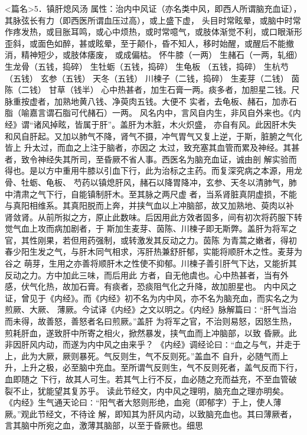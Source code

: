 \documentclass[a4paper,12pt,UTF8,twoside]{ctexbook}
\begin{document}
<篇名>5．镇肝熄风汤
属性：治内中风证（亦名类中风，即西人所谓脑充血证），其脉弦长有力（即西医所谓血压过高），或上盛下虚， 
头目时常眩晕，或脑中时常作疼发热，或目胀耳鸣，或心中烦热，或时常噫气，或肢体渐觉不利，或口眼渐形 
歪斜，或面色如醉，甚或眩晕，至于颠仆，昏不知人，移时始醒，或醒后不能撤消，精神短少，或肢体痿废， 
或成偏枯。 
怀牛膝（一两） 生赭石（一两，轧细） 生龙骨（五钱，捣碎） 生牡蛎（五钱，捣碎） 生龟板 
（五钱，捣碎） 生杭芍（五钱） 玄参（五钱） 天冬（五钱） 川楝子（二钱，捣碎） 生麦芽（二钱） 
茵陈（二钱） 甘草（钱半） 
心中热甚者，加生石膏一两。痰多者，加胆星二钱。尺脉重按虚者，加熟地黄八钱、净萸肉五钱。大便不 
实者，去龟板、赭石，加赤石脂（喻嘉言谓石脂可代赭石）一两。 
风名内中，言风自内生，非风自外来也。《内经》谓“诸风掉眩，皆属于肝”。盖肝为木脏，木火炽盛， 
亦自有风。此因肝木失和风自肝起。又加以肺气不降，肾气不摄，冲气胃气又复上逆，于斯，脏腑之气化皆上 
升太过，而血之上注于脑者，亦因之 
太过，致充塞其血管而累及神经。其甚者，致令神经失其所司，至昏厥不省人事。西医名为脑充血证，诚由剖 
解实验而得也。是以方中重用牛膝以引血下行，此为治标之主药。而复深究病之本源，用龙骨、牡蛎、龟板、 
芍药以镇熄肝风，赭石以降胃降冲，玄参、天冬以清肺气，肺中清肃之气下行，自能镇制肝木。至其脉之两尺虚 
者，当系肾脏真阴虚损，不能与真阳相维系。其真阳脱而上奔，并挟气血以上冲脑部，故又加熟地、萸肉以补 
肾敛肾。从前所拟之方，原止此数味。后因用此方效者固多，间有初次将药服下转觉气血上攻而病加剧者，于 
斯加生麦芽、茵陈、川楝子即无斯弊。盖肝为将军之官，其性刚果，若但用药强制，或转激发其反动之力。茵陈 
为青蒿之嫩者，得初春少阳生发之气，与肝木同气相求，泻肝热兼舒肝郁，实能将顺肝木之性。麦芽为谷之 
萌芽，生用之亦善将顺肝木之性使不抑郁。川楝子善引肝气下达，又能折其反动之力。方中加此三味，而后用此 
方者，自无他虞也。心中热甚者，当有外感，伏气化热，故加石膏。有痰者，恐痰阻气化之升降，故加胆星也。 
内中风之证，曾见于《内经》。而《内经》初不名为内中风，亦不名为脑充血，而实名之为煎厥、大厥、 
薄厥。今试译《内经》之文以明之。《内经》脉解篇曰∶“肝气当治而未得，故善怒，善怒者名曰煎厥。”盖肝 
为将军之官，不治则易怒，因怒生热，煎耗肝血，遂致肝中所寄之相火，掀然暴发，挟气血而上冲脑部，以致 
昏厥。此非因肝风内动，而遂为内中风之由来乎？ 
《内经》调经论曰∶“血之与气，并走于上，此为大厥，厥则暴死。气反则生，气不反则死。”盖血不 
自升，必随气而上升，上升之极，必至脑中充血。至所谓气反则生，气不反则死者，盖气反而下行，血即随之 
下行，故其人可生。若其气上行不反，血必随之充而益充，不至血管破裂不止，犹能望其复苏乎。 
读此节经文，内中风之理明，脑充血之理亦明矣。 
《内经》生气通天论曰∶“阳气者大怒则形绝，血宛（即郁字）于上，使人薄厥。”观此节经文，不待诠 
解，即知其为肝风内动，以致脑充血也。其曰薄厥者，言其脑中所宛之血，激薄其脑部，以至于昏厥也。细思 
\end{document}
